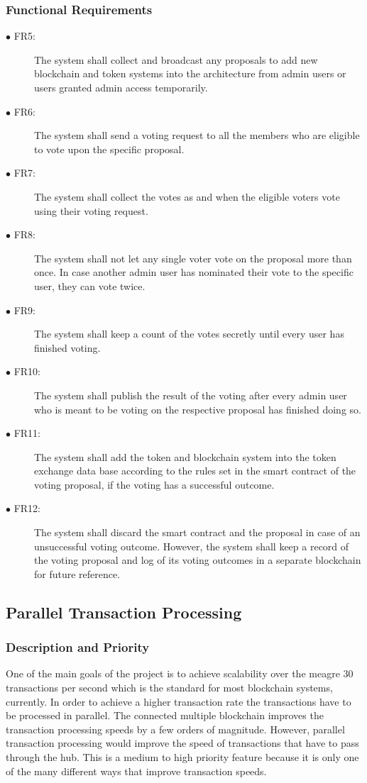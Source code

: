 \documentclass[a4paper,twoside,phd]{BYUPhys}
\begin{document}
\subsubsection{Functional Requirements}
\begin{description}
\item[$\bullet$ FR5:] The system shall collect and broadcast any proposals to add new blockchain and token systems into the architecture from admin users or users granted admin access temporarily.
\item[$\bullet$ FR6:] The system shall send a voting request to all the members who are eligible to vote upon the specific proposal.
\item[$\bullet$ FR7:] The system shall collect the votes as and when the eligible voters vote using their voting request.
\item[$\bullet$ FR8:] The system shall not let any single voter vote on the proposal more than once. In case another admin user has nominated their vote to the specific user, they can vote twice.
\item[$\bullet$ FR9:] The system shall keep a count of the votes secretly until every user has finished voting.
\item[$\bullet$ FR10:] The system shall publish the result of the voting after every admin user who is meant to be voting on the respective proposal has finished doing so.
\item[$\bullet$ FR11:] The system shall add the token and blockchain system into the token exchange data base according to the rules set in the smart contract of the voting proposal, if the voting has a successful outcome.
\item[$\bullet$ FR12:] The system shall discard the smart contract and the proposal in case of an unsuccessful voting outcome. However, the system shall keep a record of the voting proposal and log of its voting outcomes in a separate blockchain for future reference.
\end{description}
\subsection{Parallel Transaction Processing}
\subsubsection{Description and Priority}
One of the main goals of the project is to achieve scalability over the meagre 30 transactions per second which is the standard for most blockchain systems, currently. In order to achieve a higher transaction rate the transactions have to be processed in parallel. The connected multiple blockchain improves the transaction processing speeds by a few orders of magnitude. However, parallel transaction processing would improve the speed of transactions that have to pass through the hub. This is a medium to high priority feature because it is only one of the many different ways that improve transaction speeds. 
\end{document}

